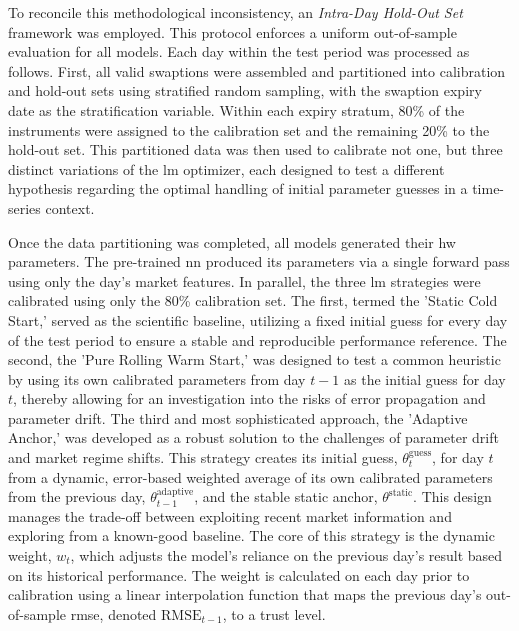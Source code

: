To reconcile this methodological inconsistency, an \emph{Intra-Day Hold-Out Set} framework was employed. This protocol enforces a uniform out-of-sample evaluation for all models. Each day within the test period was processed as follows. First, all valid swaptions were assembled and partitioned into calibration and hold-out sets using stratified random sampling, with the swaption expiry date as the stratification variable. Within each expiry stratum, 80\% of the instruments were assigned to the calibration set and the remaining 20\% to the hold-out set. This partitioned data was then used to calibrate not one, but three distinct variations of the \ac{lm} optimizer, each designed to test a different hypothesis regarding the optimal handling of initial parameter guesses in a time-series context.

Once the data partitioning was completed, all models generated their \ac{hw} parameters. The pre-trained \ac{nn} produced its parameters via a single forward pass using only the day's market features. In parallel, the three \ac{lm} strategies were calibrated using only the 80\% calibration set. The first, termed the 'Static Cold Start,' served as the scientific baseline, utilizing a fixed initial guess for every day of the test period to ensure a stable and reproducible performance reference. The second, the 'Pure Rolling Warm Start,' was designed to test a common heuristic by using its own calibrated parameters from day $t-1$ as the initial guess for day $t$, thereby allowing for an investigation into the risks of error propagation and parameter drift. The third and most sophisticated approach, the 'Adaptive Anchor,' was developed as a robust solution to the challenges of parameter drift and market regime shifts. This strategy creates its initial guess, $\theta_{t}^{\text{guess}}$, for day $t$ from a dynamic, error-based weighted average of its own calibrated parameters from the previous day, $\theta_{t-1}^{\text{adaptive}}$, and the stable static anchor, $\theta^{\text{static}}$. This design manages the trade-off between exploiting recent market information and exploring from a known-good baseline. The core of this strategy is the dynamic weight, $w_t$, which adjusts the model's reliance on the previous day's result based on its historical performance. The weight is calculated on each day prior to calibration using a linear interpolation function that maps the previous day's out-of-sample \ac{rmse}, denoted $\text{RMSE}_{t-1}$, to a trust level.

